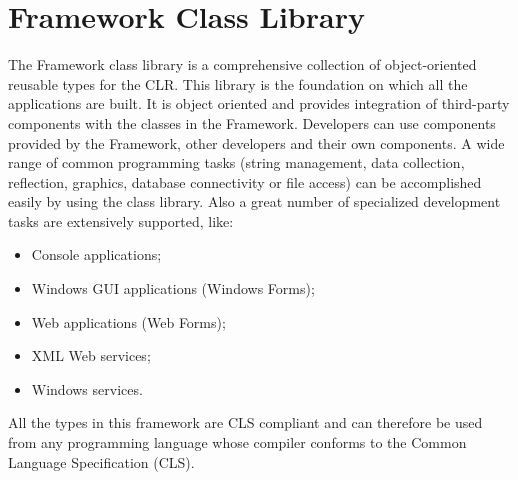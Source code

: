 \section{Framework Class Library}
\label{sec:fcl}
The \dotNET Framework class library is a comprehensive collection of object-oriented reusable types for the CLR. 
This library is the foundation on which all the \dotNET applications are built.
It is object oriented and provides integration of third-party components with the classes in the \dotNET Framework.
Developers can use components provided by the \dotNET Framework, other developers and their own components.
%
%
A wide range of common programming tasks (\eg string management, data collection, reflection, graphics, database connectivity or file access) can be accomplished easily by using the class library.
Also a great number of specialized development tasks are extensively supported, like:
\begin{itemize}[noitemsep]
  \item Console applications;
  \item Windows GUI applications (Windows Forms);
  \item Web applications (Web Forms);
  \item XML Web services;
  \item Windows services.
\end{itemize}
All the types in this framework are CLS compliant and can therefore be used from any programming language whose compiler conforms to the Common Language Specification (CLS).